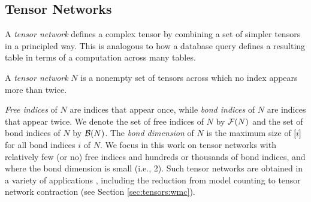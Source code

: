 
\subsection{Tensor Networks}
\label{sec:tensors:tensors:tensor-networks}
A \emph{tensor network} defines a complex tensor by combining a set of simpler tensors in a principled way. This is analogous to how a database query defines a resulting table in terms of a computation across many tables.

\begin{definition}
	\label{def:tensor-contraction-network}
	A \emph{tensor network} $N$ is a nonempty set of tensors across which no index appears more than twice.
\end{definition}

\emph{Free indices} of $N$ are indices that appear once, while \emph{bond indices} of $N$ are indices that appear twice. We denote the set of free indices of $N$ by $\mathcal{F}(N)$ and the set of bond indices of $N$ by $\mathcal{B}(N)$. The \emph{bond dimension} of $N$ is the maximum size of $[i]$ for all bond indices $i$ of $N$. We focus in this work on tensor networks with relatively few (or no) free indices and hundreds or thousands of bond indices, and where the bond dimension is small (i.e., 2). Such tensor networks are obtained in a variety of applications \cite{Cichocki14,DLVR18}, including the reduction from model counting to tensor network contraction \cite{BMT15} (see Section \ref{sec:tensors:wmc}).

